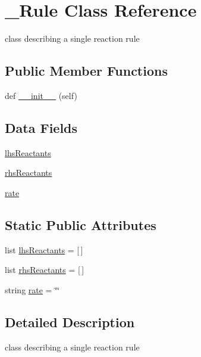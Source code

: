 \hypertarget{class_mu_mo_t_1_1___rule}{}\section{\+\_\+\+Rule Class Reference}
\label{class_mu_mo_t_1_1___rule}


class describing a single reaction rule  


\subsection*{Public Member Functions}
\begin{DoxyCompactItemize}
\item 
def \hyperlink{class_mu_mo_t_1_1___rule_ae64f0875afe3067b97ba370b354b9213}{\+\_\+\+\_\+init\+\_\+\+\_\+} (self)
\end{DoxyCompactItemize}
\subsection*{Data Fields}
\begin{DoxyCompactItemize}
\item 
\hyperlink{class_mu_mo_t_1_1___rule_ac74b250c5bb6d9c932272ab5ba3e7a9a}{lhs\+Reactants}
\item 
\hyperlink{class_mu_mo_t_1_1___rule_ad26a9ebdfecee5e673d2091e9780a5df}{rhs\+Reactants}
\item 
\hyperlink{class_mu_mo_t_1_1___rule_a1d580470818c2fa51a0bf3a86bc595bf}{rate}
\end{DoxyCompactItemize}
\subsection*{Static Public Attributes}
\begin{DoxyCompactItemize}
\item 
list \hyperlink{class_mu_mo_t_1_1___rule_abda7634f206816d08628031e2ccff839}{lhs\+Reactants} = \mbox{[}$\,$\mbox{]}
\item 
list \hyperlink{class_mu_mo_t_1_1___rule_a905a778fdb168004b0daf5839672fb9b}{rhs\+Reactants} = \mbox{[}$\,$\mbox{]}
\item 
string \hyperlink{class_mu_mo_t_1_1___rule_a7d242d56dec64e54f0a1e7e9981eda54}{rate} = \char`\"{}\char`\"{}
\end{DoxyCompactItemize}


\subsection{Detailed Description}
class describing a single reaction rule 

